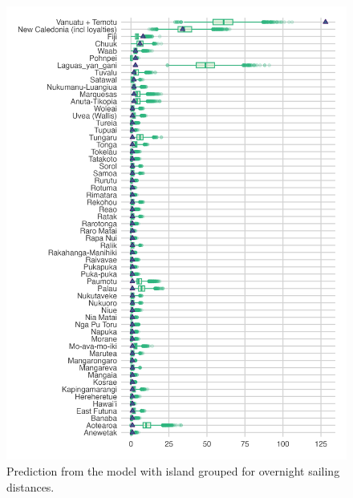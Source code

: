 \documentclass[a4paper,10pt]{article} %
\begin{document}
\begin{figure}[ht]
\centering
\includegraphics[width=\textwidth]{brms_predict_Marck.png}
\caption{Prediction from the model with island grouped for overnight sailing distances.}
\label{Marck_model_predict}
\end{figure}

\end{document}
